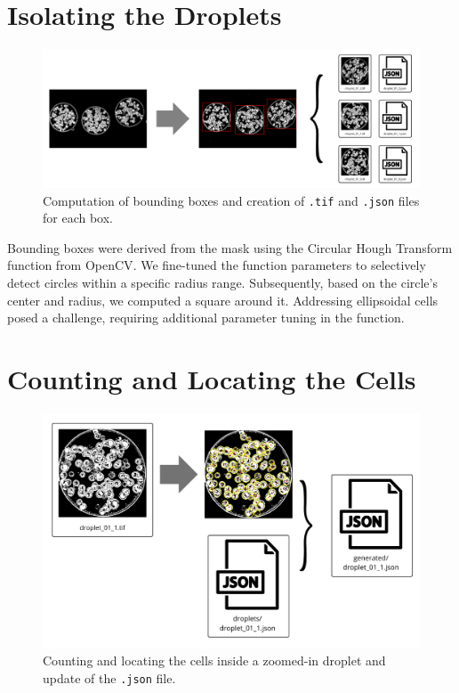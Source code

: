 \documentclass[12pt]{beamer}
\begin{document}
\begin{frame}[t]
\begin{multicols}{3}
\section{Isolating the Droplets}
    \begin{figure}[H]
        \centering
        \includegraphics[width=.9\linewidth]{figs/section2.png}
        \caption{Computation of bounding boxes and creation of \texttt{.tif} and \texttt{.json} files for each box.}
        \label{fig:droplets}
    \end{figure}
Bounding boxes were derived from the mask using the Circular Hough Transform function from OpenCV\cite{cv2}. We fine-tuned the function parameters to selectively detect circles within a specific radius range. Subsequently, based on the circle's center and radius, we computed a square around it. Addressing ellipsoidal cells posed a challenge, requiring additional parameter tuning in the function.

\section{Counting and Locating the Cells}
    \begin{figure}[H]
        \centering
        \includegraphics[width=.8\linewidth]{figs/section3.png}
        \caption{Counting and locating the cells inside a zoomed-in droplet and update of the \texttt{.json} file.}
        \label{fig:count}
    \end{figure}


\end{multicols}
\end{frame}
\end{document}
